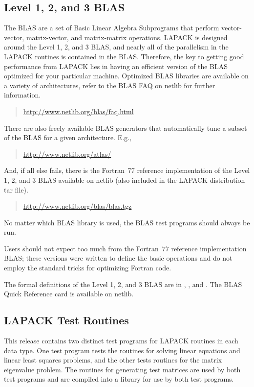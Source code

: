\documentclass[11pt]{report}
\begin{document}
\subsection{Level 1, 2, and 3 BLAS}

The BLAS are a set of Basic Linear Algebra Subprograms that perform
vector-vector, matrix-vector, and matrix-matrix operations. 
LAPACK is designed around the Level 1, 2, and 3 BLAS, and nearly all
of the parallelism in the LAPACK routines is contained in the BLAS.
Therefore,
the key to getting good performance from LAPACK lies in having an
efficient version of the BLAS optimized for your particular machine. 
Optimized BLAS libraries are available on a variety of architectures,
refer to the BLAS FAQ on netlib for further information.
\begin{quote}
\url{http://www.netlib.org/blas/faq.html}
\end{quote}
There are also freely available BLAS generators that automatically
tune a subset of the BLAS for a given architecture.  E.g.,
\begin{quote}
\url{http://www.netlib.org/atlas/}
\end{quote}
And, if all else fails, there is the Fortran~77 reference implementation
of the Level 1, 2, and 3 BLAS available on netlib (also included in
the LAPACK distribution tar file).
\begin{quote}
\url{http://www.netlib.org/blas/blas.tgz}
\end{quote}
No matter which BLAS library is used, the BLAS test programs should
always be run.

Users should not expect too much from the Fortran~77 reference implementation
BLAS; these versions were written to define the basic operations and do not
employ the standard tricks for optimizing Fortran code.

The formal definitions of the Level 1, 2, and 3 BLAS
are in \cite{BLAS1}, \cite{BLAS2}, and \cite{BLAS3}. 
The BLAS Quick Reference card is available on netlib.

\subsection{LAPACK Test Routines}

This release contains two distinct test programs for LAPACK routines
in each data type.  One test program tests the routines for solving
linear equations and linear least squares problems,
and the other tests routines for the matrix eigenvalue problem.
The routines for generating test matrices are used by both test
programs and are compiled into a library for use by both test programs.
\end{document}
